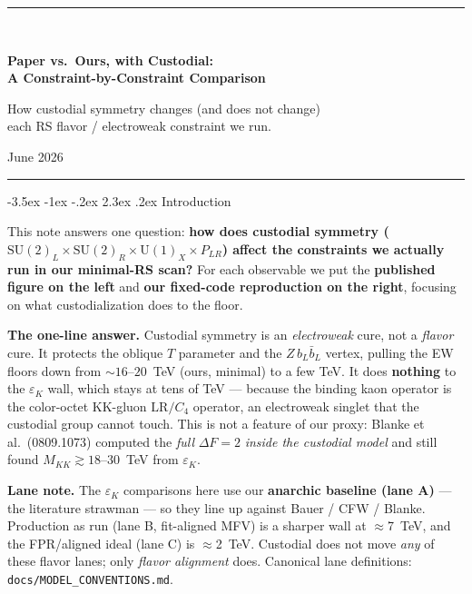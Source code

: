 \documentclass[11pt]{article}
\makeatletter
\renewcommand\section{\@startsection{section}{1}{\z@}%
  {-3.5ex \@plus -1ex \@minus -.2ex}%
  {2.3ex \@plus.2ex}%
  {\normalfont\Large\bfseries\color{accent}}}
\makeatother
\begin{document}
\begin{center}
{\color{accent}\rule{\textwidth}{1.5pt}}\\[1.2em]
{\LARGE\bfseries Paper vs.\ Ours, with Custodial:\\[0.3em]
A Constraint-by-Constraint Comparison\par}
\vspace{0.8em}
{\large How custodial symmetry changes (and does not change)\\
each RS flavor / electroweak constraint we run.\par}
\vspace{0.7em}
{\large June 2026\par}
\vspace{0.4em}
{\color{accent}\rule{\textwidth}{1.5pt}}
\end{center}
\vspace{1em}

\section{Introduction}

This note answers one question: \textbf{how does custodial symmetry
($\mathrm{SU(2)}_L\times\mathrm{SU(2)}_R\times\mathrm{U(1)}_X\times P_{LR}$)
affect the constraints we actually run in our minimal-RS scan?} For each
observable we put the \textbf{published figure on the left} and \textbf{our
fixed-code reproduction on the right}, focusing on what custodialization does to
the floor.

\textbf{The one-line answer.} Custodial symmetry is an \emph{electroweak} cure,
not a \emph{flavor} cure. It protects the oblique $T$ parameter and the
$Z\,b_L\bar b_L$ vertex, pulling the EW floors down from ${\sim}16$--$20$~TeV
(ours, minimal) to a few TeV. It does \textbf{nothing} to the $\varepsilon_K$
wall, which stays at tens of TeV --- because the binding kaon operator is the
color-octet KK-gluon $\mathrm{LR}/C_4$ operator, an electroweak singlet that the
custodial group cannot touch. This is not a feature of our proxy: Blanke et al.\
(0809.1073) computed the \emph{full} $\Delta F=2$ \emph{inside the custodial
model} and still found $M_{KK}\gtrsim18$--$30$~TeV from $\varepsilon_K$.

\textbf{Lane note.} The $\varepsilon_K$ comparisons here use our
\textbf{anarchic baseline (lane A)} --- the literature strawman --- so they line
up against Bauer / CFW / Blanke. Production as run (lane B, fit-aligned MFV) is a
sharper wall at $\approx$7~TeV, and the FPR/aligned ideal (lane C) is
$\approx$2~TeV. Custodial does not move \emph{any} of these flavor lanes; only
\emph{flavor alignment} does. Canonical lane definitions:
\texttt{docs/MODEL\_CONVENTIONS.md}.
\end{document}
